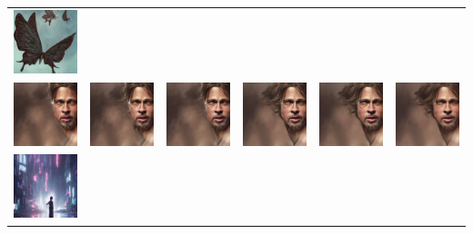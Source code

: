 \begin{table}[!htb]
\begin{tabular}{c c@{}c@{}c@{}c@{}c}
    \includegraphics[width=0.155\linewidth]{chapter/appendix/def_imgs/butterfly/b_50.png} \\
    \includegraphics[width=0.155\linewidth]{chapter/appendix/def_imgs/bradpitt/bp_0.png} & 
    \includegraphics[width=0.155\linewidth]{chapter/appendix/def_imgs/bradpitt/bp_10.png} &
    \includegraphics[width=0.155\linewidth]{chapter/appendix/def_imgs/bradpitt/bp_20.png} &
    \includegraphics[width=0.155\linewidth]{chapter/appendix/def_imgs/bradpitt/bp_30.png} &
    \includegraphics[width=0.155\linewidth]{chapter/appendix/def_imgs/bradpitt/bp_40.png} &
    \includegraphics[width=0.155\linewidth]{chapter/appendix/def_imgs/bradpitt/bp_50.png} \\
    \includegraphics[width=0.155\linewidth]{chapter/appendix/def_imgs/cyberpunk2/c2_0.png} & 

\end{tabular}
\end{table}
